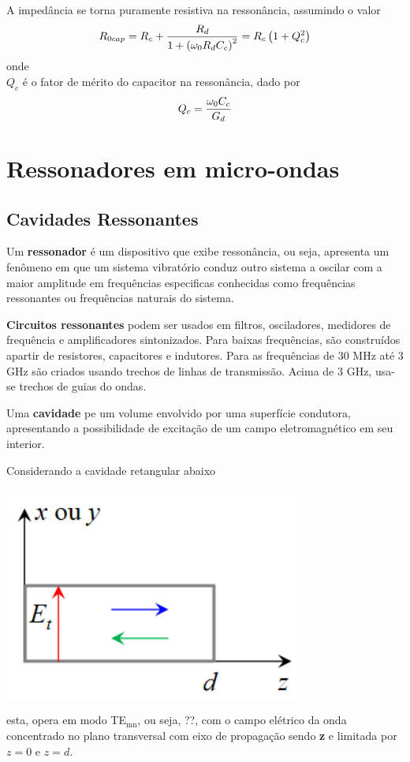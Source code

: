 A impedância se torna puramente resistiva na ressonância, assumindo o valor
\begin{equation}
R_{0cap}=R_c+\displaystyle \frac{\displaystyle R_d }{ \displaystyle 1+\left(\omega_0R_dC_c\right)^2}=R_c\left(1+Q_c^2\right)
\end{equation}
onde\\
$Q_c$ é o fator de mérito do capacitor na ressonância, dado por
\begin{equation}
Q_c=\displaystyle \frac{\displaystyle \omega_0C_c }{ \displaystyle G_d}
\end{equation}

\chapter{Ressonadores em micro-ondas}

\section{Cavidades Ressonantes}

Um \textbf{ressonador} é um dispositivo que exibe ressonância, ou seja, apresenta um fenômeno em que um sistema vibratório conduz outro sistema a oscilar com a maior amplitude em frequências especificas conhecidas como frequências ressonantes ou frequências naturais do sistema.


\textbf{Circuitos ressonantes} podem ser usados em filtros, osciladores, medidores de frequência e amplificadores sintonizados. Para baixas frequências, são construídos  apartir de resistores, capacitores e indutores. Para as frequências  de 30 MHz até 3 GHz são criados usando trechos de linhas de transmissão. Acima de 3 GHz, usa-se trechos de guias do ondas.


Uma \textbf{cavidade} pe um volume envolvido por uma superfície condutora, apresentando a possibilidade de excitação de um campo eletromagnético em seu interior.


Considerando a cavidade retangular abaixo
\begin{center}
	\includegraphics[height=7cm]{figCavidadeRetangular.png}
\end{center}
esta, opera em modo TE$_{\text{mn}}$, ou seja, ??, com o campo elétrico da onda concentrado no plano transversal com eixo de propagação sendo \textbf{z} e limitada por $z=0$ e $z=d$.


